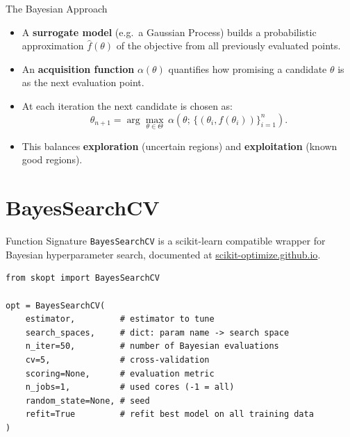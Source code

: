 \documentclass{beamer}
\begin{document}
\begin{frame}{The Bayesian Approach}
  \begin{itemize}
    \item A \textbf{surrogate model} (e.g.\ a Gaussian Process) builds a probabilistic approximation \(\hat{f}(\theta)\) of the objective from all previously evaluated points.
    \item An \textbf{acquisition function} \(\alpha(\theta)\) quantifies how promising a candidate \(\theta\) is as the next evaluation point.
    \item At each iteration the next candidate is chosen as:
    \begin{equation}
      \theta_{n+1} = \arg\max_{\theta \in \Theta}\, \alpha\!\left(\theta;\, \{(\theta_i, f(\theta_i))\}_{i=1}^{n}\right).
    \end{equation}
    \item This balances \textbf{exploration} (uncertain regions) and \textbf{exploitation} (known good regions).
  \end{itemize}
\end{frame}

\section{BayesSearchCV}

\begin{frame}[fragile]{Function Signature}
  \texttt{BayesSearchCV} is a scikit-learn compatible wrapper for Bayesian hyperparameter search, documented at \href{https://scikit-optimize.github.io/stable/modules/generated/skopt.BayesSearchCV.html}{scikit-optimize.github.io}.
  \begin{lstlisting}
from skopt import BayesSearchCV

opt = BayesSearchCV(
    estimator,         # estimator to tune
    search_spaces,     # dict: param name -> search space
    n_iter=50,         # number of Bayesian evaluations
    cv=5,              # cross-validation
    scoring=None,      # evaluation metric
    n_jobs=1,          # used cores (-1 = all)
    random_state=None, # seed
    refit=True         # refit best model on all training data
)
  \end{lstlisting}
\end{frame}
\end{document}
